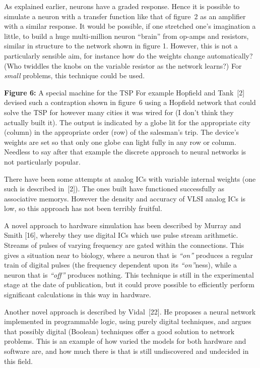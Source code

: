 \documentclass[12pt]{report}
\begin{document}
As explained earlier, neurons have a graded response.
Hence it is possible to simulate a neuron with a transfer function like
that of figure~2 as an amplifier with a similar response.
It would be possible, if one stretched one's imagination a little, to
build a huge multi-million neuron ``brain'' from op-amps and resistors,
similar in structure to the network shown in figure 1.
However, this is not a particularly sensible aim, for instance how do
the weights change automatically? (Who twiddles the knobs on the
variable resistor as the network learns?)
For {\sl small\/} problems, this technique could be used.
\par\textbf{Figure 6:} A special machine for the TSP
For example Hopfield and Tank~[2] devised such a contraption shown in
figure~6 using a Hopfield network that could solve the TSP for however
many cities it was wired for (I don't think they actually built it).
The output is indicated by a globe lit for the appropriate city (column)
in the appropriate order (row) of the salesman's trip.
The device's weights are set so that only one globe can light fully in
any row or column.
Needless to say after that example the discrete approach to neural networks is not
particularly popular.

There have been some attempts at analog ICs with variable internal
weights (one such is described in~[2]).
The ones built have functioned successfully as associative memorys.
However the density and accuracy of VLSI analog ICs is low, so
this approach has not been terribly fruitful.

A novel approach to hardware simulation has been described by Murray and
Smith [16], whereby they use digital ICs which use pulse stream
arithmetic.
Streams of pulses of varying frequency are gated within the connections.
This gives a situation near to biology, where a neuron that is {\sl ``on''\/}
produces a regular train of digital pulses (the frequency dependent upon
its {\sl ``on''}ness), while a neuron that is {\sl ``off''\/} produces nothing.
This technique is still in the experimental stage at the date of
publication, but it could prove possible to efficiently perform
significant calculations in this way in hardware.

Another novel approach is described by Vidal~[22].
He proposes a neural network implemented in programmable logic, using purely
digital techniques, and argues that possibly digital (Boolean)
techniques offer a good solution to network problems.
This is an example of how varied the models for both hardware and
software are, and how much there is that is still undiscovered and
undecided in this field.
\end{document}
